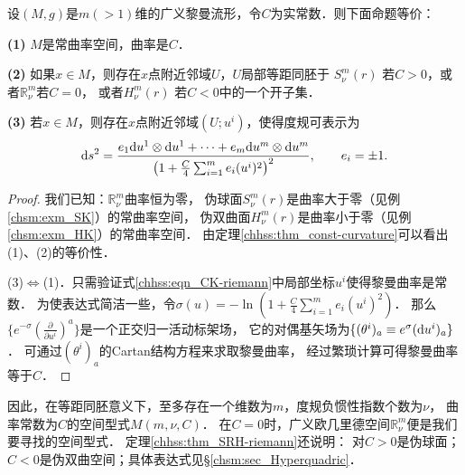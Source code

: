 \begin{theorem}\label{chhss:thm_SRH-riemann}
    设$(M,g)$是$m(>1)$维的广义黎曼流形，令$C$为实常数．则下面命题等价：
    
    {\bfseries (1)} $M$是常曲率空间，曲率是$C$．
    
    {\bfseries (2)} 如果$x\in M$，则存在$x$点附近邻域$U$，$U$局部等距同胚于
    $S^m_\nu(r)$ 若$C>0$，或者$\mathbb{R}^m_\nu$若$C=0$，
    或者$H^m_\nu(r)$ 若$C<0$中的一个开子集．
    
    {\bfseries (3)} 若$x\in M$，则存在$x$点附近邻域$(U;u^i)$，使得度规可表示为
    \begin{equation}\label{chhss:eqn_CK-riemann}
        {\rm d}s^2=\frac{e_1 {\rm d}u^1 \otimes {\rm d}u^1 + \cdots +e_m {\rm d}u^m \otimes {\rm d}u^m}
        {\left(1+\tfrac{C}{4} \sum_{i=1}^{m} e_i (u^i)^2\right)^2},\qquad e_i=\pm 1.
    \end{equation}
\end{theorem}
\begin{proof}
    我们已知：$\mathbb{R}^m_\nu$曲率恒为零，
    伪球面$S^m_\nu(r)$是曲率大于零（见例\ref{chsm:exm_SK}）的常曲率空间，
    伪双曲面$H^m_\nu(r)$是曲率小于零（见例\ref{chsm:exm_HK}）的常曲率空间．
    由定理\ref{chhss:thm_const-curvature}可以看出(1)、(2)的等价性．
    
    (3)$\Leftrightarrow $(1)．只需验证式\eqref{chhss:eqn_CK-riemann}中局部坐标$u^i$使得黎曼曲率是常数．
    为使表达式简洁一些，令$\sigma(u) =-\ln \left(1+\tfrac{C}{4} \sum_{i=1}^{m} e_i (u^i)^2\right) $．
    那么$\{e^{-\sigma} (\frac{\partial}{\partial u^i})^a \}$是一个正交归一活动标架场，
    它的对偶基矢场为$\{(\theta^i)_a\equiv e^{\sigma} ({\rm d}u^i)_a \}$．
    可通过$(\theta^i)_a$的Cartan结构方程来求取黎曼曲率，
    经过繁琐计算可得黎曼曲率等于$C$．
\end{proof}


因此，在等距同胚意义下，至多存在一个维数为$m$，度规负惯性指数个数为$\nu$，
曲率常数为$C$的空间型式$M(m, \nu, C)$．
在$C = 0$时，广义欧几里德空间$\mathbb{R}^m_\nu$便是我们要寻找的空间型式．
定理\ref{chhss:thm_SRH-riemann}还说明：
对$C>0$是伪球面；$C<0$是伪双曲空间；具体表达式见\S\ref{chsm:sec_Hyperquadric}．



